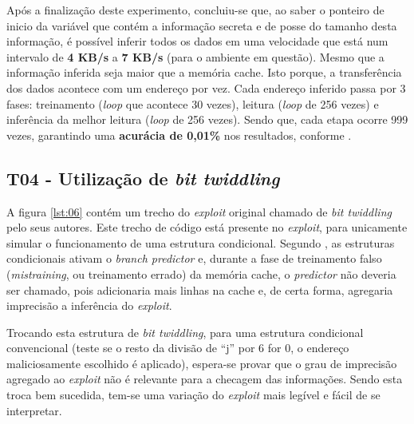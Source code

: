 \documentclass[conference]{IEEEtran}
\begin{document}


Após a finalização deste experimento, concluiu-se que, ao saber o ponteiro de inicio da variável que contém a informação secreta e de posse do tamanho desta informação, é possível inferir todos os dados em uma velocidade que está num intervalo de \textbf{4 KB/s} a \textbf{7 KB/s} (para o ambiente em questão). Mesmo que a informação inferida seja maior que a memória cache. Isto porque, a transferência dos dados acontece com um endereço por vez. Cada endereço inferido passa por 3 fases: treinamento (\emph{loop} que acontece 30 vezes), leitura (\emph{loop} de 256 vezes) e inferência da melhor leitura (\emph{loop} de 256 vezes). Sendo que, cada etapa ocorre 999 vezes, garantindo uma \textbf{acurácia de 0,01\%} nos resultados, conforme .

\begin{comment}
Adicionar uma imagem com as saídas.
\end{comment}

\subsection{T04 - Utilização de \emph{bit twiddling}}
A figura \ref{lst:06} contém um trecho do \emph{exploit} original chamado de \emph{bit twiddling} pelo seus autores. Este trecho de código está presente no \emph{exploit}, para unicamente simular o funcionamento de uma estrutura condicional. Segundo , as estruturas condicionais ativam o \emph{branch predictor} e, durante a fase de treinamento falso (\emph{mistraining}, ou treinamento errado) da memória cache, o \emph{predictor} não deveria ser chamado, pois adicionaria mais linhas na cache e, de certa forma, agregaria imprecisão a inferência do \emph{exploit}.



Trocando esta estrutura de \emph{bit twiddling}, para uma estrutura condicional convencional (teste se o resto da divisão de ``j'' por 6 for 0, o endereço maliciosamente escolhido é aplicado), espera-se provar que o grau de imprecisão agregado ao \emph{exploit} não é relevante para a checagem das informações. Sendo esta troca bem sucedida, tem-se uma variação do \emph{exploit} mais legível e fácil de se interpretar.
\end{document}
